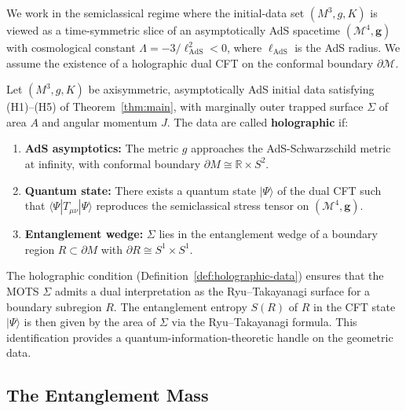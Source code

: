 We work in the semiclassical regime where the initial-data set $(M^3, g, K)$ is viewed as a time-symmetric slice of an asymptotically AdS spacetime $(\mathcal{M}^4, \mathbf{g})$ with cosmological constant $\Lambda = -3/\ell_{\mathrm{AdS}}^2 < 0$, where $\ell_{\mathrm{AdS}}$ is the AdS radius. We assume the existence of a holographic dual CFT on the conformal boundary $\partial\mathcal{M}$.

\begin{definition}\label{def:holographic-data}
Let $(M^3, g, K)$ be axisymmetric, asymptotically AdS initial data satisfying (H1)--(H5) of Theorem~\ref{thm:main}, with marginally outer trapped surface $\Sigma$ of area $A$ and angular momentum $J$. The data are called \textbf{holographic} if:
\begin{enumerate}
\item \textbf{AdS asymptotics:} The metric $g$ approaches the AdS-Schwarzschild metric at infinity, with conformal boundary $\partial M \cong \mathbb{R} \times S^2$.
\item \textbf{Quantum state:} There exists a quantum state $|\Psi\rangle$ of the dual CFT such that $\langle\Psi|T_{\mu\nu}|\Psi\rangle$ reproduces the semiclassical stress tensor on $(\mathcal{M}^4, \mathbf{g})$.
\item \textbf{Entanglement wedge:} $\Sigma$ lies in the entanglement wedge of a boundary region $R \subset \partial M$ with $\partial R \cong S^1 \times S^1$.
\end{enumerate}
\end{definition}

\begin{remark}
The holographic condition (Definition~\ref{def:holographic-data}) ensures that the MOTS $\Sigma$ admits a dual interpretation as the Ryu--Takayanagi surface for a boundary subregion $R$. The entanglement entropy $S(R)$ of $R$ in the CFT state $|\Psi\rangle$ is then given by the area of $\Sigma$ via the Ryu--Takayanagi formula. This identification provides a quantum-information-theoretic handle on the geometric data.
\end{remark}

\subsection{The Entanglement Mass}

